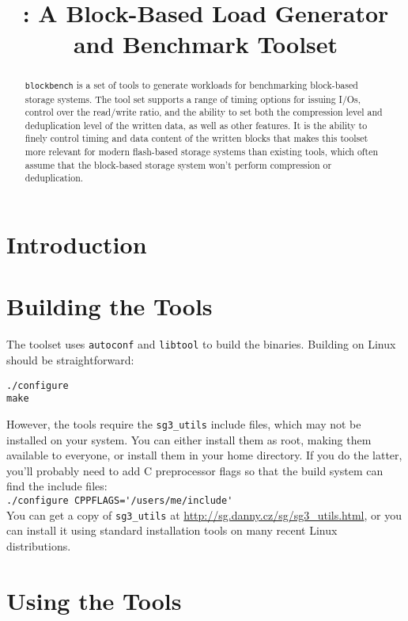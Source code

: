 \documentclass[letterpaper,11pt]{article}
\title{\blockbench: A Block-Based Load Generator and Benchmark Toolset}
\author{}
\newcommand{\blockbench}{\texttt{blockbench}\xspace}
\begin{document}
\maketitle

\begin{abstract}
  \blockbench is a set of tools to generate workloads for benchmarking block-based
  storage systems.  The tool set supports a range of timing options for issuing I/Os,
  control over the read/write ratio, and the ability to set both the compression level and
  deduplication level of the written data, as well as other features.  It is the ability
  to finely control timing and data content of the written blocks that makes this
  toolset more relevant for modern flash-based storage systems than existing tools, which
  often assume that the block-based storage system won't perform compression or deduplication.
\end{abstract}

\section{Introduction}

\section{Building the Tools}

The toolset uses \verb+autoconf+ and \verb+libtool+ to build the binaries.  Building on Linux
should be straightforward: \\
\begin{verbatim}
./configure
make
\end{verbatim}

However, the tools require the \verb+sg3_utils+ include files, which may not be installed on
your system.  You can either install them as root, making them available to everyone, or install
them in your home directory.  If you do the latter, you'll probably need to add C preprocessor
flags so that the build system can find the include files: \\
\verb+./configure CPPFLAGS='/users/me/include'+ \\
You can get a copy of \verb+sg3_utils+ at \url{http://sg.danny.cz/sg/sg3_utils.html}, or you
can install it using standard installation tools on many recent Linux distributions.

\section{Using the Tools}
\end{document}
